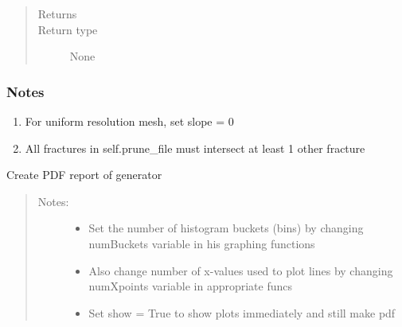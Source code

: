 \documentclass[letterpaper,10pt,english]{sphinxmanual}
\begin{document}
\begin{fulllineitems}
\begin{fulllineitems}
\begin{quote}
\begin{description}
\begin{itemize}
\end{itemize}

\item[{Returns}] \leavevmode


\item[{Return type}] \leavevmode
None

\end{description}\end{quote}
\subsubsection*{Notes}
\begin{enumerate}
\def\theenumi{\arabic{enumi}}
\def\labelenumi{\theenumi .}
\makeatletter\def\p@enumii{\p@enumi \theenumi .}\makeatother
\item {} 
For uniform resolution mesh, set slope = 0

\item {} 
All fractures in self.prune\_file must intersect at least 1 other fracture

\end{enumerate}

\end{fulllineitems}


\begin{fulllineitems}
\label{\detokenize{pydfnworks:pydfnworks.general.dfnworks.DFNWORKS.output_report}}
Create PDF report of generator
\begin{quote}
\begin{description}
\item[{Notes:}] \leavevmode\begin{itemize}
\item {} 
Set the number of histogram buckets (bins) by changing numBuckets variable in his graphing functions

\item {} 
Also change number of x-values used to plot lines by changing numXpoints variable in appropriate funcs

\item {} 
Set show = True to show plots immediately and still make pdf


\end{itemize}
\end{description}
\end{quote}
\end{fulllineitems}
\end{fulllineitems}
\end{document}
